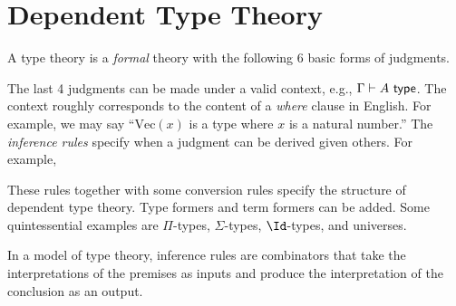 \documentclass{amsart}
\begin{document}
\section{Dependent Type Theory}
\label{sec:dependent-type-theory}
A type theory is a \emph{formal} theory with the following 6 basic forms of judgments.
The last 4 judgments can be made under a valid context, e.g., $\Gamma \vdash A ~\mathsf{type}$.
The context roughly corresponds to the content of a \emph{where} clause in English.
For example, we may say ``$\mathrm{Vec}(x)$ is a type where $x$ is a natural number.''
The \emph{inference rules} specify when a judgment can be derived given others.
For example,
These rules together with some conversion rules specify the structure of dependent type theory.
Type formers and term formers can be added.
Some quintessential examples are $\Pi$-types, $\Sigma$-types, $\Id$-types, and universes.

In a model of type theory, inference rules are combinators that take the interpretations of the premises as inputs and produce the interpretation of the conclusion as an output.
\end{document}
